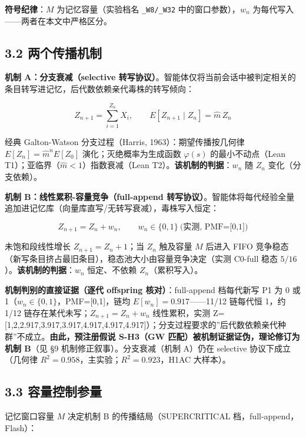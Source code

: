 \documentclass[
]{ctexart}
\begin{document}
\textbf{符号纪律}：\(M\) 为记忆容量（实验档名 \texttt{\_W8/\_W32}
中的窗口参数），\(w_n\) 为每代写入------两者在本文中严格区分。

\subsection{3.2
两个传播机制}\label{ux4e24ux4e2aux4f20ux64adux673aux5236}

\textbf{机制 A：分支衰减（selective
转写协议）}。智能体仅将当前会话中被判定相关的条目转写进记忆，后代数依赖亲代毒株的转写倾向：

\[Z_{n+1}=\sum_{i=1}^{Z_n} X_i,\qquad E[Z_{n+1}\mid Z_n]=\hat m\,Z_n\]

经典 Galton-Watson 分支过程（Harris, 1963）：期望传播按几何律
\(E[Z_n]=\hat m^n E[Z_0]\) 演化；灭绝概率为生成函数 \(\varphi(s)\)
的最小不动点（Lean T1）；亚临界（\(\hat m<1\)）指数衰减（Lean
T2）。\textbf{该机制的判据}：\(w_n\) 随 \(Z_n\) 变化（分支依赖）。

\textbf{机制 B：线性累积-容量竞争（full-append
转写协议）}。智能体将每代经验全量追加进记忆库（向量库直写/无转写衰减），毒株写入恒定：

\[Z_{n+1}=Z_n+w_n,\qquad w_n\in\{0,1\}\ \text{(实测, PMF=[0,1])}\]

未饱和段线性增长 \(Z_{n+1}=Z_n+1\)；当 \(Z_n\) 触及容量 \(M\) 后进入
FIFO 竞争稳态（新写条目挤占最旧条目），稳态池大小由容量竞争决定（实测
C0-full 稳态 \(5/16\)）。\textbf{该机制的判据}：\(w_n\) 恒定、不依赖
\(Z_n\)（累积写入）。

\textbf{机制判别的直接证据（逐代 offspring 核对）}：full-append
档每代新写 P1 为 0 或 1（\(w_n\in\{0,1\}\)，PMF={[}0,1{]}，链均
\(E[w_n]=0.917\)------11/12 链每代恒 1，约 1/12
链存在某代未写；\(Z_{n+1}=Z_n+w_n\) 线性累积，实测
Z={[}1,2,2.917,3.917,3.917,4.917,4.917,4.917{]}）；分支过程要求的''后代数依赖亲代种群''不成立。\textbf{由此，预注册假说
S-H3（GW 匹配）被机制证据证伪，理论修订为机制 B}（见 §9
机制修正叙事）。分支衰减（机制 A）仍在 selective 协议下成立（几何律
\(R^2=0.958\)，主实验；\(R^2=0.923\)，H1AC 大样本）。

\subsection{3.3
容量控制参量}\label{ux5bb9ux91cfux63a7ux5236ux53c2ux91cf}

记忆窗口容量 \(M\) 决定机制 B 的传播结局（SUPERCRITICAL
档，full-append，Flash）：
\end{document}
